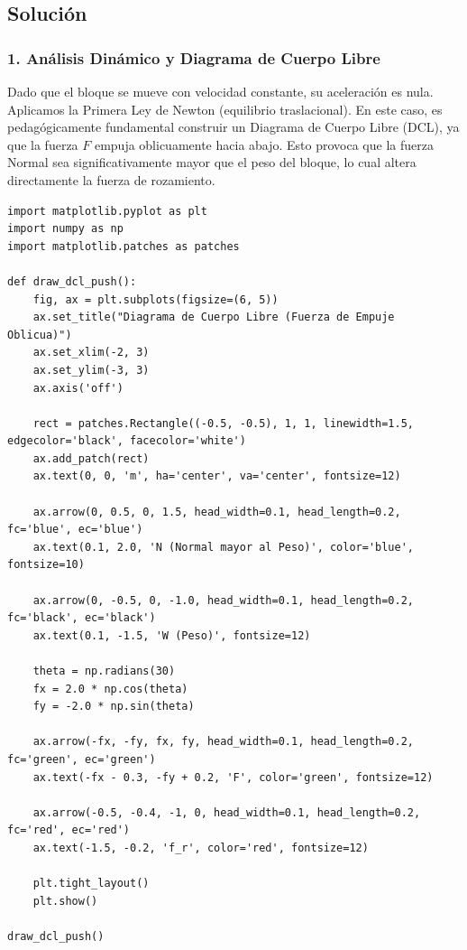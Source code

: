 \documentclass[12pt, a4paper]{article}
\begin{document}
\subsection*{Solución}

\subsubsection*{1. Análisis Dinámico y Diagrama de Cuerpo Libre}
Dado que el bloque se mueve con velocidad constante, su aceleración es nula. Aplicamos la Primera Ley de Newton (equilibrio traslacional). En este caso, es pedagógicamente fundamental construir un Diagrama de Cuerpo Libre (DCL), ya que la fuerza $F$ empuja oblicuamente hacia abajo. Esto provoca que la fuerza Normal sea significativamente mayor que el peso del bloque, lo cual altera directamente la fuerza de rozamiento.

\begin{lstlisting}
import matplotlib.pyplot as plt
import numpy as np
import matplotlib.patches as patches

def draw_dcl_push():
    fig, ax = plt.subplots(figsize=(6, 5))
    ax.set_title("Diagrama de Cuerpo Libre (Fuerza de Empuje Oblicua)")
    ax.set_xlim(-2, 3)
    ax.set_ylim(-3, 3)
    ax.axis('off')
    
    rect = patches.Rectangle((-0.5, -0.5), 1, 1, linewidth=1.5, edgecolor='black', facecolor='white')
    ax.add_patch(rect)
    ax.text(0, 0, 'm', ha='center', va='center', fontsize=12)
    
    ax.arrow(0, 0.5, 0, 1.5, head_width=0.1, head_length=0.2, fc='blue', ec='blue')
    ax.text(0.1, 2.0, 'N (Normal mayor al Peso)', color='blue', fontsize=10)
    
    ax.arrow(0, -0.5, 0, -1.0, head_width=0.1, head_length=0.2, fc='black', ec='black')
    ax.text(0.1, -1.5, 'W (Peso)', fontsize=12)
    
    theta = np.radians(30)
    fx = 2.0 * np.cos(theta)
    fy = -2.0 * np.sin(theta)
    
    ax.arrow(-fx, -fy, fx, fy, head_width=0.1, head_length=0.2, fc='green', ec='green')
    ax.text(-fx - 0.3, -fy + 0.2, 'F', color='green', fontsize=12)
    
    ax.arrow(-0.5, -0.4, -1, 0, head_width=0.1, head_length=0.2, fc='red', ec='red')
    ax.text(-1.5, -0.2, 'f_r', color='red', fontsize=12)

    plt.tight_layout()
    plt.show()

draw_dcl_push()
\end{lstlisting}
\end{document}

